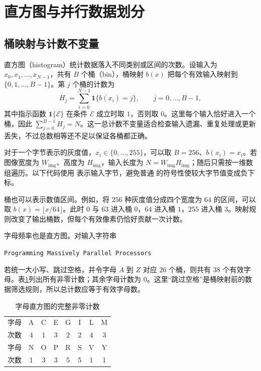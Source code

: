 \section{直方图与并行数据划分}
\label{l13:sec:histogram}

\subsection{桶映射与计数不变量}

直方图（histogram）统计数据落入不同类别或区间的次数。设输入为 $x_0,x_1,\ldots,x_{N-1}$，共有 $B$ 个桶（bin），桶映射 $b(x)$ 把每个有效输入映射到 $\{0,1,\ldots,B-1\}$。第 $j$ 个桶的计数为
\begin{equation}
H_j=\sum_{i=0}^{N-1}\mathbf{1}\{b(x_i)=j\},
\qquad j=0,\ldots,B-1,
\label{l13:eq:histogram}
\end{equation}
其中指示函数 $\mathbf{1}\{\mathcal E\}$ 在条件 $\mathcal E$ 成立时取 $1$，否则取 $0$。这里每个输入恰好进入一个桶，因此 $\sum_{j=0}^{B-1}H_j=N$。这一总计数不变量适合检查输入遗漏、重复处理或更新丢失，不过总数相等还不足以保证各桶都正确。

对于一个字节表示的灰度值，$x_i\in\{0,\ldots,255\}$，可以取 $B=256$、$b(x_i)=x_i$。若图像宽度为 $W_{\mathrm{img}}$、高度为 $H_{\mathrm{img}}$，输入长度为 $N=W_{\mathrm{img}}H_{\mathrm{img}}$；随后只需按一维数组遍历。以下代码使用 \mbox{} 表示输入字节，避免普通 \mbox{} 的符号性使较大字节值变成负下标。

桶也可以表示数值区间。例如，将 $256$ 种灰度值分成四个宽度为 $64$ 的区间，可以取 $b(x)=\lfloor x/64\rfloor$。此时 $0$ 与 $63$ 进入桶 $0$，$64$ 进入桶 $1$，$255$ 进入桶 $3$。映射规则改变了输出桶数，但每个有效像素仍恰好贡献一次计数。

字母频率也是直方图。对输入字符串
\begin{center}
\texttt{Programming Massively Parallel Processors}
\end{center}
若统一大小写、跳过空格，并令字母 $A$ 到 $Z$ 对应 $26$ 个桶，则共有 $38$ 个有效字母。表\ref{l13:tab:letters}列出所有非零计数；其余字母计数为 $0$。这里“跳过空格”是桶映射前的数据筛选规则，所以总计数应等于有效字母数。

\begin{table}[htbp]
\centering
\caption{字母直方图的完整非零计数}
\label{l13:tab:letters}
\begin{tabular}{c*{7}{c}}
\toprule
字母 & A & C & E & G & I & L & M \\
次数 & 4 & 1 & 3 & 2 & 2 & 4 & 3 \\
\midrule
字母 & N & O & P & R & S & V & Y \\
次数 & 1 & 3 & 3 & 5 & 5 & 1 & 1 \\
\bottomrule
\end{tabular}
\end{table}

